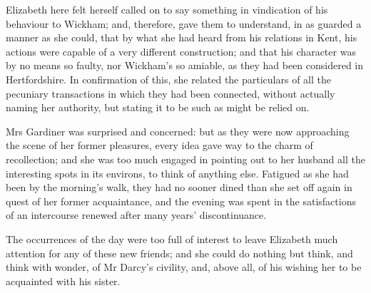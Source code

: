 Elizabeth here felt herself called on to say something in vindication of his behaviour to Wickham; and, therefore, gave them to understand, in as guarded a manner as she could, that by what she had heard from his relations in Kent, his actions were capable of a very different construction; and that his character was by no means so faulty, nor Wickham's so amiable, as they had been considered in Hertfordshire. In confirmation of this, she related the particulars of all the pecuniary transactions in which they had been connected, without actually naming her authority, but stating it to be such as might be relied on.

Mrs Gardiner was surprised and concerned: but as they were now approaching the scene of her former pleasures, every idea gave way to the charm of recollection; and she was too much engaged in pointing out to her husband all the interesting spots in its environs, to think of anything else. Fatigued as she had been by the morning's walk, they had no sooner dined than she set off again in quest of her former acquaintance, and the evening was spent in the satisfactions of an intercourse renewed after many years' discontinuance.

The occurrences of the day were too full of interest to leave Elizabeth much attention for any of these new friends; and she could do nothing but think, and think with wonder, of Mr Darcy's civility, and, above all, of his wishing her to be acquainted with his sister.
